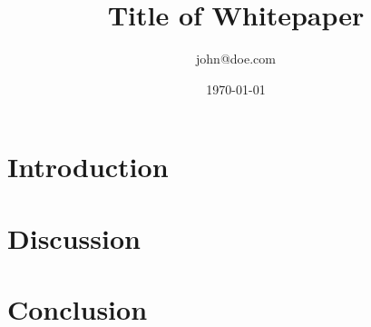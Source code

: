 \documentclass[12pt]{article}
\begin{document}
\title{Title of Whitepaper}
\author{\small john@doe.com}
\date{\today}

\maketitle

\begin{abstract}
\lipsum[1]
\end{abstract}

\section{Introduction}
\lipsum[2-3]

\section{Discussion}
\lipsum[4-7]

\section{Conclusion}
\lipsum[8]
\end{document}
